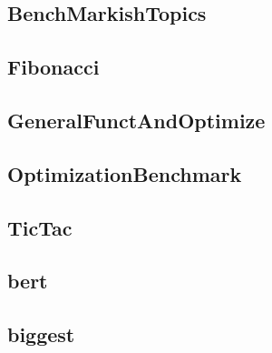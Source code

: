 
\newpage
\subsection{BenchMarkishTopics}
    \begin{figure}[h]
	    \centering
		
	\end{figure}


\newpage
\subsection{Fibonacci}
    \begin{figure}[h]
	    \centering
		
	\end{figure}


\newpage
\subsection{GeneralFunctAndOptimize}
    \begin{figure}[h]
	    \centering
		
	\end{figure}


\newpage
\subsection{OptimizationBenchmark}
    \begin{figure}[h]
	    \centering
		
	\end{figure}


\newpage
\subsection{TicTac}
    \begin{figure}[h]
	    \centering
		
	\end{figure}


\newpage
\subsection{bert}
    \begin{figure}[h]
	    \centering
		
	\end{figure}


\newpage
\subsection{biggest}
    \begin{figure}[h]
	    \centering
		
	\end{figure}


